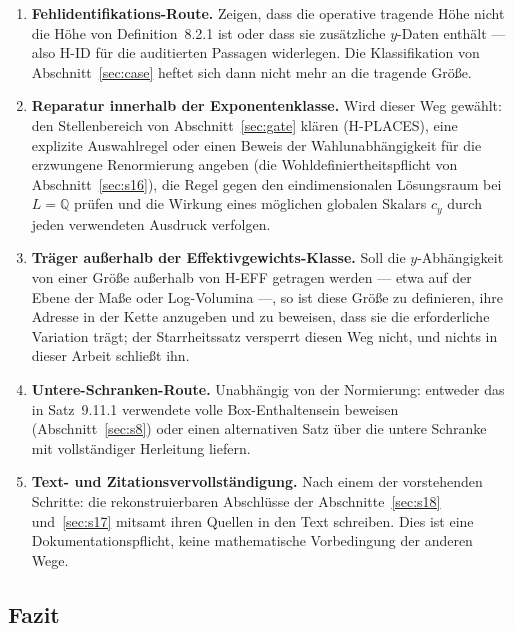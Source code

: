 \documentclass[11pt,a4paper]{article}
\theoremstyle{definition}
\theoremstyle{remark}
\begin{document}
\begin{enumerate}
\item \textbf{Fehlidentifikations-Route.} Zeigen, dass die operative
  tragende Höhe nicht die Höhe von Definition~8.2.1 ist oder dass sie
  zusätzliche $y$-Daten enthält --- also H-ID für die auditierten Passagen
  widerlegen. Die Klassifikation von Abschnitt~\ref{sec:case} heftet sich
  dann nicht mehr an die tragende Größe.
\item \textbf{Reparatur innerhalb der Exponentenklasse.} Wird dieser Weg
  gewählt: den Stellenbereich von Abschnitt~\ref{sec:gate} klären
  (H-PLACES), eine explizite Auswahlregel oder einen Beweis der
  Wahlunabhängigkeit für die erzwungene Renormierung angeben (die
  Wohldefiniertheitspflicht von Abschnitt~\ref{sec:s16}), die Regel gegen
  den eindimensionalen Lösungsraum bei $L = \mathbb{Q}$ prüfen und die
  Wirkung eines möglichen globalen Skalars $c_y$ durch jeden verwendeten
  Ausdruck verfolgen.
\item \textbf{Träger außer\-halb der Effektiv\-gewichts-Klasse.} Soll die
  $y$-Ab\-hän\-gig\-keit von einer Größe außerhalb von H-EFF getragen werden ---
  etwa auf der Ebene der Maße oder Log-Volumina ---, so ist diese Größe zu
  definieren, ihre Adresse in der Kette anzugeben und zu beweisen, dass sie
  die erforderliche Variation trägt; der Starrheitssatz versperrt diesen
  Weg nicht, und nichts in dieser Arbeit schließt ihn.
\item \textbf{Untere-Schranken-Route.} Unabhängig von der Normierung:
  entweder das in Satz~9.11.1 verwendete volle Box-Enthaltensein beweisen
  (Abschnitt~\ref{sec:s8}) oder einen alternativen Satz über die untere
  Schranke mit vollständiger Herleitung liefern.
\item \textbf{Text- und Zitationsvervollständigung.} Nach einem der
  vorstehenden Schritte: die rekonstruierbaren Abschlüsse der
  Abschnitte~\ref{sec:s18} und~\ref{sec:s17} mitsamt ihren Quellen in den
  Text schreiben. Dies ist eine Dokumentationspflicht, keine mathematische
  Vorbedingung der anderen Wege.
\end{enumerate}

\subsection{Fazit}
\end{document}
